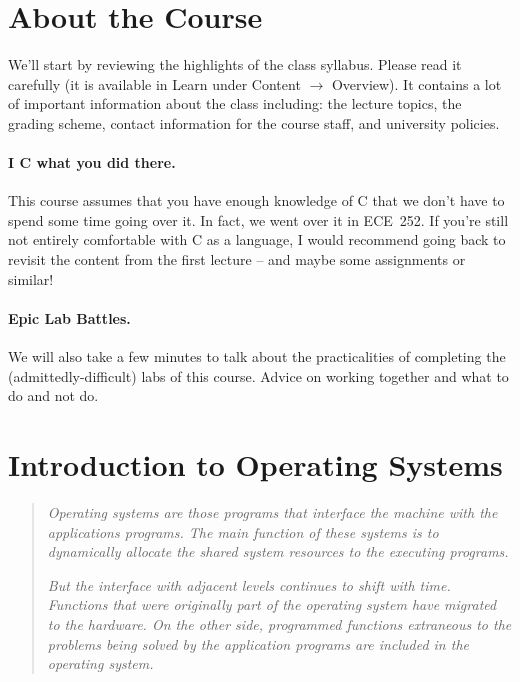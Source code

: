 




\section*{About the Course}
We'll start by reviewing the highlights of the class syllabus. Please read it carefully (it is available in Learn under Content $\rightarrow$ Overview). It contains a lot of important information about the class including: the lecture topics, the grading scheme, contact information for the course staff, and university policies.

\paragraph{I C what you did there.}
This course assumes that you have enough knowledge of C that we don't have to spend some time going over it. In fact, we went over it in ECE~252. If you're still not entirely comfortable with C as a language, I would recommend going back to revisit the content from the first lecture -- and maybe some assignments or similar!

\paragraph{Epic Lab Battles.}
We will also take a few minutes to talk about the practicalities of completing the (admittedly-difficult) labs of this course. Advice on working together and what to do and not do.

\section*{Introduction to Operating Systems}


\begin{quote}
\textit{Operating systems are those programs that interface the machine with the applications programs. The main function of these systems is to dynamically allocate the shared system resources to the executing programs.}

\textit{But the interface with adjacent levels continues to shift with
time. Functions that were originally part of the operating system have migrated to the hardware. On the other side, programmed functions extraneous to the problems being solved by the application programs are included in the operating system.
}
\end{quote}

